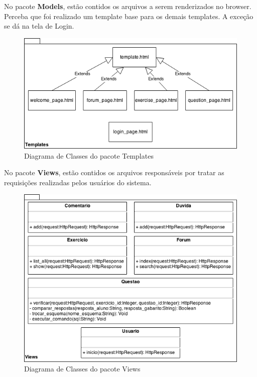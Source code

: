 \documentclass[graduacao,brazil]{ThesisPUC}
\begin{document}
No pacote \textbf{Models}, est\~{a}o contidos os arquivos a serem renderizados no browser.
Perceba que foi realizado um template base para os demais templates. A exce\c{c}\~{a}o se d\'{a}
na tela de Login.

\begin{figure}[H]
    \centering
    \includegraphics[width=\linewidth]{Imagens/DiagramaDeClasseTemplates.png}
    \caption{Diagrama de Classes do pacote Templates}
\end{figure}

No pacote \textbf{Views}, est\~{a}o contidos os arquivos respons\'{a}veis por tratar as
requisi\c{c}\~{o}es realizadas pelos usu\'{a}rios do sistema.

\begin{figure}[H]
    \centering
    \includegraphics[width=\linewidth]{Imagens/DiagramaDeClasseViews.png}
    \caption{Diagrama de Classes do pacote Views}
\end{figure}
\end{document}

